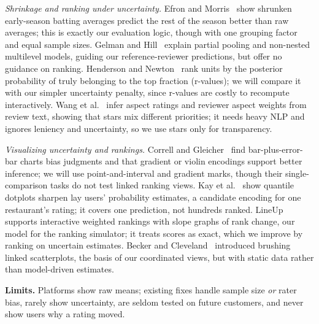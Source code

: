 \documentclass[11pt,letterpaper]{article}
\begin{document}
\textit{Shrinkage and ranking under uncertainty.} Efron and Morris~\cite{efron1975} show shrunken early-season batting averages predict the rest of the season better than raw averages; this is exactly our evaluation logic, though with one grouping factor and equal sample sizes. Gelman and Hill~\cite{gelman2007} explain partial pooling and non-nested multilevel models, guiding our reference-reviewer predictions, but offer no guidance on ranking. Henderson and Newton~\cite{henderson2016} rank units by the posterior probability of truly belonging to the top fraction (r-values); we will compare it with our simpler uncertainty penalty, since r-values are costly to recompute interactively. Wang et al.~\cite{wang2010} infer aspect ratings and reviewer aspect weights from review text, showing that stars mix different priorities; it needs heavy NLP and ignores leniency and uncertainty, so we use stars only for transparency.

\textit{Visualizing uncertainty and rankings.} Correll and Gleicher~\cite{correll2014} find bar-plus-error-bar charts bias judgments and that gradient or violin encodings support better inference; we will use point-and-interval and gradient marks, though their single-comparison tasks do not test linked ranking views. Kay et al.~\cite{kay2016} show quantile dotplots sharpen lay users' probability estimates, a candidate encoding for one restaurant's rating; it covers one prediction, not hundreds ranked. LineUp~\cite{gratzl2013} supports interactive weighted rankings with slope graphs of rank change, our model for the ranking simulator; it treats scores as exact, which we improve by ranking on uncertain estimates. Becker and Cleveland~\cite{becker1987} introduced brushing linked scatterplots, the basis of our coordinated views, but with static data rather than model-driven estimates.

\textbf{Limits.} Platforms show raw means; existing fixes handle sample size \emph{or} rater bias, rarely show uncertainty, are seldom tested on future customers, and never show users why a rating moved.
\end{document}
